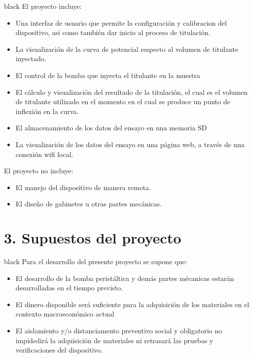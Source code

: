\documentclass[11pt]{charter}
\begin{document}
\begin{consigna}{black}
El proyecto incluye:
\begin{itemize}
\item Una interfaz de usuario que permite la configuración y calibracion del dispositivo, asi como también dar inicio al proceso de titulación.
\item La visualización de la curva de potencial respecto al volumen de titulante inyectado.
\item El control de la bomba que inyecta el titulante en la muestra
\item El cálculo y visualización del resultado de la titulación, el cual es el volumen de titulante utilizado en el momento en el cual se produce un punto de inflexión en la curva.
\item El almacenamiento de los datos del ensayo en una memoria SD
\item La visualización de los datos del ensayo en una página web, a través de una conexión wifi local.
\end{itemize}

El proyecto no incluye:
\begin{itemize}
\item El manejo del dispositivo de manera remota.
\item El diseño de gabinetes u otras partes mecánicas. 
\end{itemize}
\end{consigna}

\section{3. Supuestos del proyecto}
\label{sec:supuestos}

\begin{consigna}{black}
Para el desarrollo del presente proyecto se supone que:

\begin{itemize}
\item El desarrollo de la bomba peristáltica y demás partes mécanicas estarán desarrolladas en el tiempo previsto.
\item El dinero disponible será suficiente para la adquisición de los materiales en el contexto macroeconómico actual
\item El aislamiento y/o distanciamento preventivo social y obligatorio no impidedirá la adquisición de materiales ni retrasará las pruebas y verificaciones del dispositivo.
\end{itemize}

\end{consigna}
\end{document}
